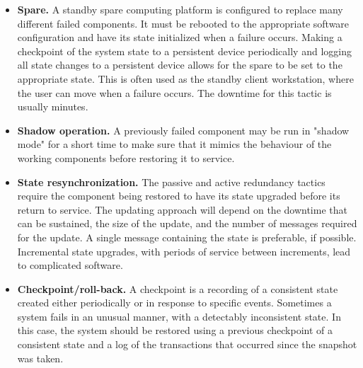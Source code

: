 \documentclass[a4paper]{article}
\begin{document}
\begin{itemize}
  \item
    \textbf{Spare.}
    A standby spare computing platform is configured to replace many different failed components. It must be rebooted to the appropriate software configuration and have its state initialized when a failure occurs. Making a checkpoint of the system state to a persistent device periodically and logging all state changes to a persistent device allows for the spare to be set to the appropriate state. This is often used as the standby client workstation, where the user can move when a failure occurs. The downtime for this tactic is usually minutes.
  \item
    \textbf{Shadow operation.}
    A previously failed component may be run in "shadow mode" for a short time to make sure that it mimics the behaviour of the working components before restoring it to service.
  \item
    \textbf{State resynchronization.}
    The passive and active redundancy tactics require the component being restored to have its state upgraded before its return to service. The updating approach will depend on the downtime that can be sustained, the size of the update, and the number of messages required for the update. A single message containing the state is preferable, if possible. Incremental state upgrades, with periods of service between increments, lead to complicated software.
  \item
    \textbf{Checkpoint/roll-back.}
    A checkpoint is a recording of a consistent state created either periodically or in response to specific events. Sometimes a system fails in an unusual manner, with a detectably inconsistent state. In this case, the system should be restored using a previous checkpoint of a consistent state and a log of the transactions that occurred since the snapshot was taken.
\end{itemize}
\end{document}
